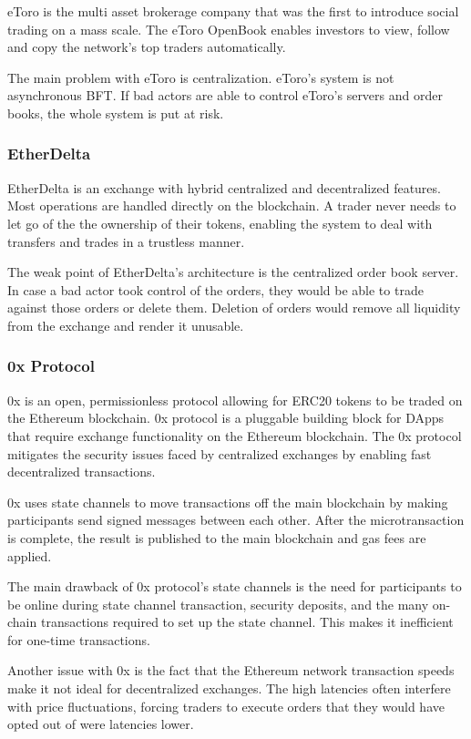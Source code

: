 \documentclass[11pt]{article}
\begin{document}
eToro is the multi asset brokerage company that was the first to introduce social trading on a mass scale. The eToro OpenBook enables investors to view, follow and copy the network's top traders automatically.


The main problem with eToro is centralization. eToro's system is not asynchronous BFT. If bad actors are able to control eToro's servers and order books, the whole system is put at risk.


\subsubsection{EtherDelta}

EtherDelta is an exchange with hybrid centralized and decentralized features. Most operations are handled directly on the blockchain. A trader never needs to let go of the the ownership of their tokens, enabling the system to deal with transfers and trades in a trustless manner.


The weak point of EtherDelta's architecture is the centralized order book server. In case a bad actor took control of the orders, they would be able to trade against those orders or delete them. Deletion of orders would remove all liquidity from the exchange and render it unusable.


\subsubsection{0x Protocol}

0x is an open, permissionless protocol allowing for ERC20 tokens to be traded on the Ethereum blockchain. 0x protocol is a pluggable building block for DApps that require exchange functionality on the Ethereum blockchain. The 0x protocol mitigates the security issues faced by centralized exchanges by enabling fast decentralized transactions.


0x uses state channels to move transactions off the main blockchain by making participants send signed messages between each other. After the microtransaction is complete, the result is published to the main blockchain and gas fees are applied.


The main drawback of 0x protocol's state channels is the need for participants to be online during state channel transaction, security deposits, and the many on-chain transactions required to set up the state channel. This makes it inefficient for one-time transactions.


Another issue with 0x is the fact that the Ethereum network transaction speeds make it not ideal for decentralized exchanges. The high latencies often interfere with price fluctuations, forcing traders to execute orders that they would have opted out of were latencies lower.
\end{document}
